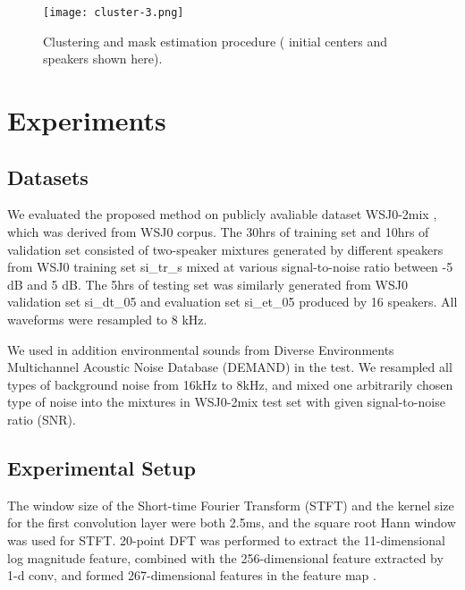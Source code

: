 \documentclass[a4paper]{article}
\begin{document}
\begin{figure}[t]
  \centering
  \texttt{[image: cluster-3.png]}
  \caption{Clustering and mask estimation procedure (  initial centers and  speakers shown here).}
  \label{fig:cluster}
\end{figure}


\section{Experiments}

\subsection{Datasets}

We evaluated the proposed method on publicly avaliable dataset WSJ0-2mix \cite{hershey2016deep}, which was derived from WSJ0 corpus. The 30hrs of training set and 10hrs of validation set consisted of two-speaker mixtures generated by different speakers from WSJ0 training set  si\_tr\_s mixed at various signal-to-noise ratio between -5 dB and 5 dB. The 5hrs of testing set was similarly generated from WSJ0 validation set si\_dt\_05 and evaluation set si\_et\_05 produced by 16 speakers. All waveforms were resampled to 8 kHz.

We used in addition environmental sounds from Diverse Environments Multichannel Acoustic Noise Database (DEMAND) \cite{thiemann2013diverse} in the test. We resampled all types of background noise from 16kHz to 8kHz, and mixed one arbitrarily chosen type of noise into the mixtures in WSJ0-2mix test set with given signal-to-noise ratio (SNR).

\subsection{Experimental Setup}
The window size of the Short-time Fourier Transform (STFT) and the kernel size for the first convolution layer were both 2.5ms, and the square root Hann window was used for STFT. 20-point DFT was performed to extract the 11-dimensional log magnitude feature, combined with the 256-dimensional feature extracted by 1-d conv, and formed 267-dimensional features in the feature map . 
\end{document}
